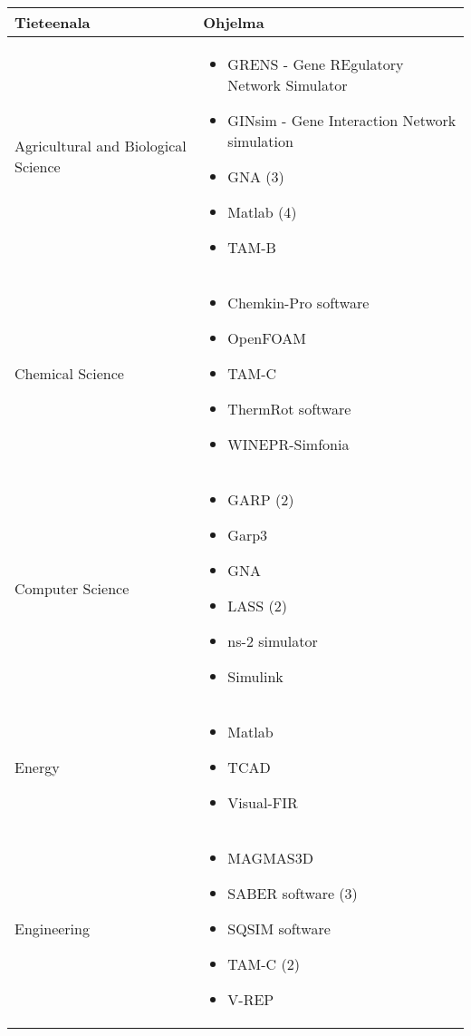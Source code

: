 \documentclass[utf8]{gradu3}
\begin{document}
\begin{longtable}[h]{|p{5cm}|p{8cm}|}
    \hline
    \textbf{Tieteenala}    &    \textbf{Ohjelma}\\
    \hline
    Agricultural and Biological Science & \begin{itemize}
        \item GRENS - Gene REgulatory Network Simulator
        \item GINsim - Gene Interaction Network simulation
        \item GNA (3)
        \item Matlab (4)
        \item TAM-B
    \end{itemize} \\
    \hline
    Chemical Science & \begin{itemize}
        \item Chemkin-Pro software
        \item OpenFOAM
        \item TAM-C
        \item ThermRot software
        \item WINEPR-Simfonia
    \end{itemize} \\
    \hline
    Computer Science & \begin{itemize}
        \item GARP (2)
        \item Garp3 
        \item GNA
        \item LASS (2)
        \item ns-2 simulator
        \item Simulink
    \end{itemize} \\
    \hline
    Energy & \begin{itemize}
        \item Matlab
        \item TCAD
        \item Visual-FIR
    \end{itemize} \\
    \hline
    Engineering & \begin{itemize}
        \item MAGMAS3D
        \item SABER software (3)
        \item SQSIM software
        \item TAM-C (2)
        \item V-REP

\end{itemize}
\end{longtable}
\end{document}
